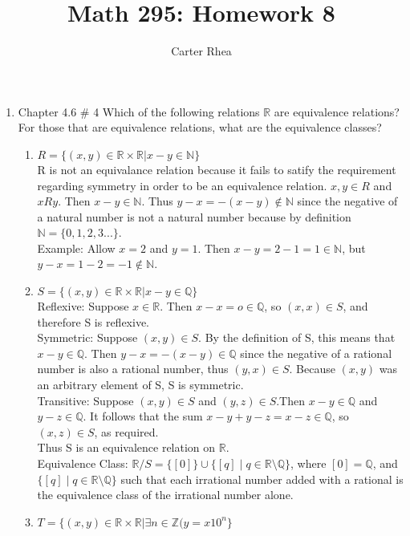 \documentclass[10pt,a4paper]{article}
\author{Carter Rhea}
\title{Math 295: Homework 8}
\begin{document}
\maketitle
\begin{enumerate}
\item Chapter 4.6 \# 4 Which of the following relations $\mathbb{R}$ are equivalence relations? For those that are equivalence relations, what are the equivalence classes?
\begin{enumerate}
\item $R = \{(x,y) \in \mathbb{R} \times \mathbb{R} | x - y \in \mathbb{N}\}$\\
R is not an equivalance relation because it fails to satify the requirement regarding symmetry in order to be an equivalence relation. $x,y \in R$ and $xRy$. Then $x -y\in \mathbb{N}$. Thus $y-x = - (x-y) \not \in \mathbb{N}$ since the negative of a natural number is not a natural number because by definition $\mathbb{N}= \{0,1,2,3...\}$.\\
Example: Allow $x=2$ and $y=1$. Then $x-y=2-1=1 \in \mathbb{N}$, but $y-x = 1-2 = -1 \not \in \mathbb{N}$.
\item $S =\{(x,y) \in \mathbb{R} \times \mathbb{R} |  x - y \in\mathbb{Q} \}$\\
Reflexive: Suppose $x \in \mathbb{R}$. Then $x-x=o \in \mathbb{Q}$, so $(x,x) \in S$, and therefore S is reflexive.\\
Symmetric: Suppose $(x,y) \in S$. By the definition of S, this means that $x-y \in \mathbb{Q}$. Then $y-x=-(x-y)\in \mathbb{Q}$ since the negative of a rational number is also a rational number,  thus $(y,x) \in S$. Because $(x,y)$ was an arbitrary element of S, S is symmetric.\\
Transitive: Suppose $(x,y) \in S$ and $(y,z) \in S$.Then $x-y \in \mathbb{Q}$ and $y-z \in \mathbb{Q}$. It follows that the sum $x-y+y-z=x-z \in \mathbb{Q}$, so $(x,z) \in S$, as required.\\
Thus S is an equivalence relation on $\mathbb{R}$.\\
Equivalence Class: $ \mathbb{R} / S=\{[0]\}\cup \{[q] \mid q\in \mathbb{R} \setminus \mathbb{Q}\}$,  where $[0] =  \mathbb{Q}$, and $\{[q]\mid q\in \mathbb{R} \setminus \mathbb{Q}\} $ such that each irrational number added with a rational is the equivalence class of the irrational number alone.  \\
\item $T = \{(x,y) \in \mathbb{R} \times \mathbb{R} | \exists n \in \mathbb{Z} (y = x 10^n \}$\\

\end{enumerate}
\end{enumerate}
\end{document}
